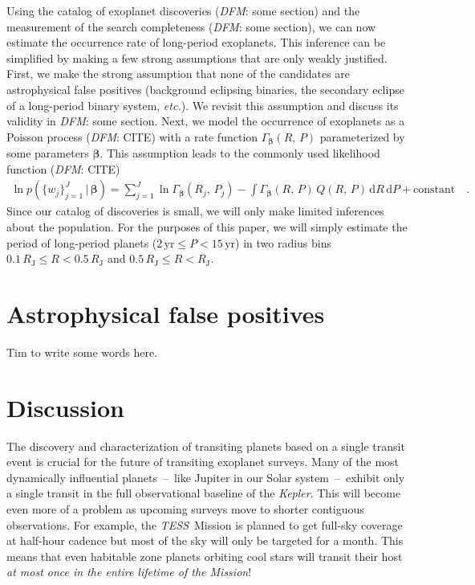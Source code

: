 \documentclass[manuscript, letterpaper]{aastex6}
\newcommand{\project}[1]{\textsl{#1}}
\newcommand{\kepler}{\project{Kepler}}
\newcommand{\tess}{\project{TESS}}
\newcommand{\foreign}[1]{\emph{#1}}
\newcommand{\etc}{\foreign{etc.}}
\newcommand{\sectlabel}[1]{\label{sect:#1}}
\newcommand{\dd}{\ensuremath{\,\mathrm{d}}}
\newcommand{\bvec}[1]{{\ensuremath{\boldsymbol{#1}}}}
\newcommand{\todo}[3]{{\color{#2}\emph{#1}: #3}}
\newcommand{\dfmtodo}[1]{\todo{DFM}{red}{#1}}
\newcommand{\poppars}{{\ensuremath{\bvec{\beta}}}}
\newcommand{\rate}{{\ensuremath{\Gamma}}}
\begin{document}
Using the catalog of exoplanet discoveries (\dfmtodo{some section}) and the
measurement of the search completeness (\dfmtodo{some section}), we can now
estimate the occurrence rate of long-period exoplanets.
This inference can be simplified by making a few strong assumptions that are
only weakly justified.
First, we make the strong assumption that none of the candidates are
astrophysical false positives (background eclipsing binaries, the secondary
eclipse of a long-period binary system, \etc).
We revisit this assumption and discuss its validity in \dfmtodo{some section}.
Next, we model the occurrence of exoplanets as a Poisson process
(\dfmtodo{CITE}) with a rate function $\rate_{\poppars} (R,\,P)$ parameterized
by some parameters \poppars.
This assumption leads to the commonly used likelihood function
(\dfmtodo{CITE})
\begin{eqnarray}
\ln p (\{w_j\}_{j=1}^J\,|\,\poppars) =
    \sum_{j=1}^J \ln \rate_{\poppars} (R_j,\,P_j)
    - \int \rate_{\poppars} (R,\,P)\,Q(R,\,P)\dd R\dd P
    + \mathrm{constant} \quad.
\end{eqnarray}
Since our catalog of discoveries is small, we will only make limited
inferences about the population.
For the purposes of this paper, we will simply estimate the period of
long-period planets ($2\,\mathrm{yr} \le P < 15\,\mathrm{yr}$) in two radius
bins $0.1\,R_\mathrm{J} \le R < 0.5\,R_\mathrm{J}$ and $0.5\,R_\mathrm{J} \le
R < R_\mathrm{J}$.





\section{Astrophysical false positives}

Tim to write some words here.



\section{Discussion}\sectlabel{discussion}

The discovery and characterization of transiting planets based on a single
transit event is crucial for the future of transiting exoplanet surveys.
Many of the most dynamically influential planets~--~like Jupiter in our Solar
system~--~exhibit only a single transit in the full observational baseline of
the \kepler.
This will become even more of a problem as upcoming surveys move to shorter
contiguous observations.
For example, the \tess\ Mission is planned to get full-sky coverage at
half-hour cadence but most of the sky will only be targeted for a month.
This means that even habitable zone planets orbiting cool stars will transit
their host \emph{at most once in the entire lifetime of the Mission}!
\end{document}
